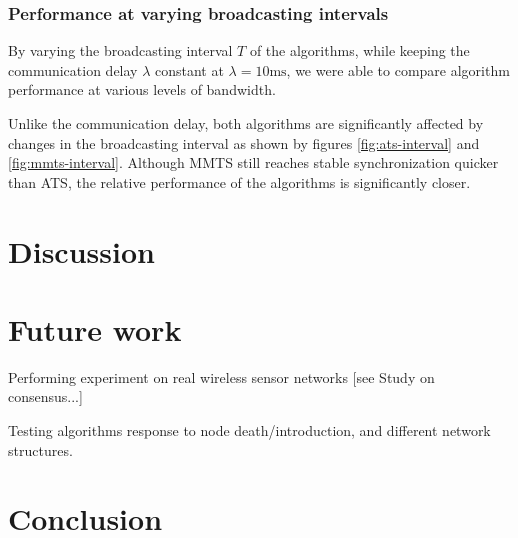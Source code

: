 \documentclass[a4paper,12pt]{article}
\begin{document}
\subsubsection{Performance at varying broadcasting intervals}
By varying the broadcasting interval $T$ of the algorithms, while keeping the communication delay $\lambda$ constant at $\lambda = 10 \text{ms}$, we were able to compare algorithm performance at various levels of bandwidth.

Unlike the communication delay, both algorithms are significantly affected by changes in the broadcasting interval as shown by figures \ref{fig:ats-interval} and \ref{fig:mmts-interval}. Although MMTS still reaches stable synchronization quicker than ATS, the relative performance of the algorithms is significantly closer.

\section{Discussion}

\section{Future work}
Performing experiment on real wireless sensor networks [see Study on consensus...]

Testing algorithms response to node death/introduction, and different network structures.

\section{Conclusion}


\end{document}
